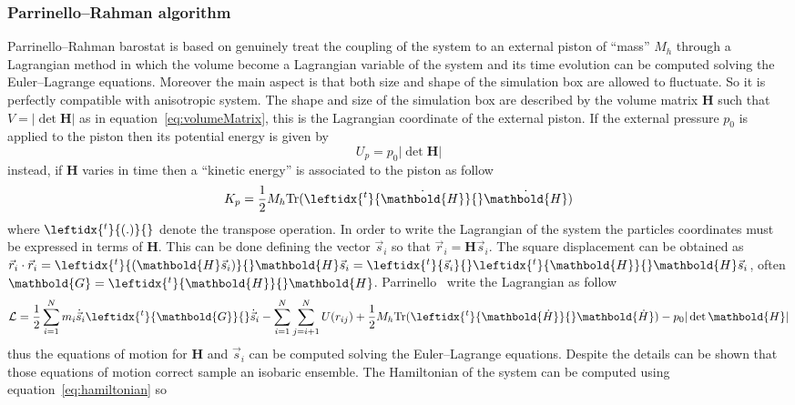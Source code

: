 \subsubsection{Parrinello--Rahman algorithm}
Parrinello--Rahman barostat \cite{ParrinelloBarostat1}\cite{ParrinelloBarostat2} is based on genuinely treat the coupling of the system to an external piston of ``mass'' $M_h$ through a Lagrangian method in which the volume become a Lagrangian variable of the system and its time evolution can be computed solving the Euler--Lagrange equations. Moreover the main aspect is that both size and shape of the simulation box are allowed to fluctuate. So it is perfectly compatible with anisotropic system. The shape and size of the simulation box are described by the volume matrix $ \mathbold{H}$ such that $V = |\det\mathbold{H}|$ as in equation~\eqref{eq:volumeMatrix}, this is the Lagrangian coordinate of the external piston. If the external pressure $p_0$ is applied to the piston then its potential energy is given by
\begin{equation*}
	U_p = p_0 |\det  \mathbold{H}|
\end{equation*}
instead, if $ \mathbold{H}$ varies in time then a ``kinetic energy'' is associated to the piston as follow
\begin{equation*}
	K_p = \frac{1}{2}M_h \text{Tr}(\leftidx{^t}{\dot{ \mathbold{H}}}{} \dot{ \mathbold{H}} )
\end{equation*}
where $\leftidx{^t}{(.)}{}$ denote the transpose operation. In order to write the Lagrangian of the system the particles coordinates must be expressed in terms of $ \mathbold{H}$. This can be done defining the vector $\vec s_i$ so that $\vec r_i =  \mathbold{H} \vec s_i$. The square displacement can be obtained as $\vec r_i \cdot \vec r_i = \leftidx{^t}{ (\mathbold{H} \vec s_i)}{}  \mathbold{H} \vec s_i = \leftidx{^t}{\vec s_i}{} \leftidx{^t}{ \mathbold{H}}{}  \mathbold{H} \vec s_i$, often $ \mathbold{G} = \leftidx{^t}{ \mathbold{H}}{} \mathbold{H}$. Parrinello \etal\, write the Lagrangian as follow
\begin{equation*}
	\mathcal{L} = \frac{1}{2}\sum_{i=1}^N m_i \dot{\vec s}_i \leftidx{^t}{\mathbold{G}}{} \dot{\vec s}_i - \sum_{i=1}^N \sum_{j=i+1}^N U(r_{ij}) +  \frac{1}{2} M_h \text{Tr}(\leftidx{^t}{\mathbold{\dot H}}{} \mathbold{\dot H} ) -  p_0 |\det \mathbold{H}|
\end{equation*}
thus the equations of motion for $ \mathbold{H}$ and $\vec s_i$ can be computed solving the Euler--Lagrange equations. Despite the details can be shown that those equations of motion correct sample an isobaric ensemble. The Hamiltonian of the system can be computed using equation~\eqref{eq:hamiltonian} so
